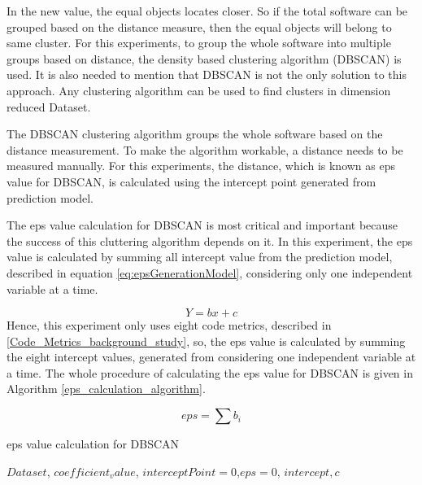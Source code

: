\documentclass[12pt]{report}
\begin{document}
In the new value, the equal objects locates closer. So if the total software can be grouped based on the distance measure, then the equal objects will belong to same cluster. For this experiments, to group the whole software into multiple groups based on distance, the density based clustering algorithm (DBSCAN) is used. It is also needed to mention that DBSCAN is not the only solution to this approach. Any clustering algorithm can be used to find clusters in dimension reduced Dataset.
 
The DBSCAN clustering algorithm groups the whole software based on the distance measurement. To make the algorithm workable, a distance needs to be measured manually. For this experiments, the distance, which is known as eps value for DBSCAN, is calculated using the intercept point generated from prediction model.

The eps value calculation for DBSCAN is most critical and important because the success of this cluttering algorithm depends on it. In this experiment, the eps value is calculated by summing all intercept value from the prediction model, described in equation \ref{eq:epsGenerationModel}, considering only one independent variable at a time. 

\begin{equation}
\label{eq:epsGenerationModel}
 Y=bx+c
\end{equation}
Hence, this experiment only uses eight code metrics, described in \ref{Code_Metrics_background_study}, so, the eps value is calculated by summing the eight intercept values, generated from considering one independent variable at a time.  
The whole procedure of calculating the eps value for DBSCAN is given in Algorithm \ref{eps_calculation_algorithm}. 

\begin{equation}
\label{eq:totalepsCalculation}
 eps=\sum{b_{i}}
\end{equation}

\begin{algorithm}
	\caption{eps value calculation for DBSCAN}
	\label{eps_calculation_algorithm}
		\begin{algorithmic}[1]
			\REQUIRE  $ Dataset$, $coefficient_value$, $interceptPoint=0$,$eps=0$, $intercept, c$
				
				\ENDFOR
		\end{algorithmic}
	\end{algorithm}
	
\end{document}
